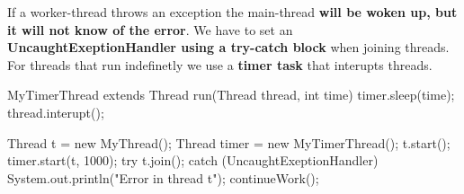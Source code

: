 \begin{important}
If a worker-thread throws an exception the main-thread \textbf{will be woken up, but it will not know of the
error}. We have to set an \textbf{UncaughtExeptionHandler using a try-catch block} when joining threads. For threads that
run indefinetly we use a \textbf{timer task} that interupts threads.
\end{important}

\begin{codeexample}
MyTimerThread extends Thread {
    run(Thread thread, int time) {
        timer.sleep(time);
        thread.interupt();
    }
}

Thread t = new MyThread();
Thread timer = new MyTimerThread();
t.start();
timer.start(t, 1000);
try {
    t.join();
} catch (UncaughtExeptionHandler) {
    System.out.println("Error in thread t");
}
continueWork();
\end{codeexample}

